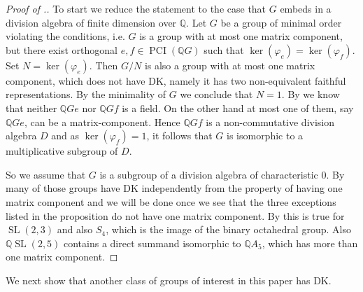 \documentclass[a4paper,10pt]{amsart}
\theoremstyle{definition}
\theoremstyle{remark}
\newcommand\PCI{\operatorname{PCI}}
\newcommand{\Q}{{\mathbb Q}}
\begin{document}
\begin{proof}[Proof of .]
To start we reduce the statement to the case that $G$ embeds in a division algebra of finite dimension over $\Q$. Let $G$ be a group of minimal order violating the conditions, i.e. $G$ is a group with at most one matrix component, but there exist orthogonal $e,f \in \PCI(\Q G)$ such that $\ker(\varphi_e) = \ker(\varphi_f)$. Set $N =\ker(\varphi_e)$. Then $G/N$ is also a group with at most one matrix component, which does not have DK, namely it has two non-equivalent faithful representations. By the minimality of $G$ we conclude that $N=1$. By  we know that neither $\Q Ge$ nor $\Q Gf$ is a field. On the other hand at most one of them, say $\Q Ge$, can be a matrix-component. Hence $\Q Gf$ is a non-commutative division algebra $D$ and as $\ker(\varphi_f) = 1$, it follows that $G$ is isomorphic to a multiplicative subgroup of $D$. 

So we assume that $G$ is a subgroup of a division algebra of characteristic $0$. By  many of those groups have DK independently from the property of having one matrix component and we will be done once we see that the three exceptions listed in the proposition do not have one matrix component. By  this is true for $\operatorname{SL}(2,3)$ and also $S_4$, which is the image of the binary octahedral group. Also $\mathbb{Q}\operatorname{SL}(2,5)$ contains a direct summand isomorphic to $\Q A_5$, which has more than one matrix component. 
\end{proof}


We next show that another class of groups of interest in this paper has DK.
\end{document}
